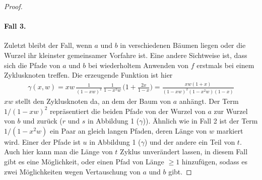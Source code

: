 \documentclass[a4paper, 10pt, ngerman]{article}
\begin{document}
\begin{proof}
    \paragraph{Fall 3.} Zuletzt bleibt der Fall, wenn $a$ und $b$ in verschiedenen Bäumen liegen oder die Wurzel ihr kleinster gemeinsamer Vorfahre ist. Eine andere Sichtweise ist, dass sich die Pfade von $a$ und $b$ bei wiederholtem Anwenden von $f$ erstmals bei einem Zyklusknoten treffen. Die erzeugende Funktion ist hier
    \begin{align*}
        \gamma(x, w)
        = xw \, \frac {1} {(1 - xw)^2} \, \frac {1} {1 - x^2w} \,
        \Bigg (1 + \frac {2x}{1 - x} \Bigg )
        = \frac {xw(1 + x)} {(1 - xw)^2(1 - x^2w)(1 - x)}
    \end{align*}
    $xw$ stellt den Zyklusknoten da, an dem der Baum von $a$ anhängt. Der Term $1/(1 - xw)^2$ repräsentiert die beiden Pfade von der Wurzel von $a$ zur Wurzel von $b$ und zurück ($r$ und $s$ in Abbildung 1 ($\gamma$)). Ähnlich wie in Fall 2 ist der Term $1/(1 - x^2w)$ ein Paar an gleich langen Pfaden, deren Länge von $w$ markiert wird. Einer der Pfade ist $u$ in Abbildung 1 ($\gamma$) und der andere ein Teil von $t$. Auch hier kann man die Länge von $t$ Zyklus unverändert lassen, in diesem Fall gibt es eine Möglichkeit, oder einen Pfad von Länge $\ge 1$ hinzufügen, sodass es zwei Möglichkeiten wegen Vertauschung von $a$ und $b$ gibt.


\end{proof}
\end{document}
